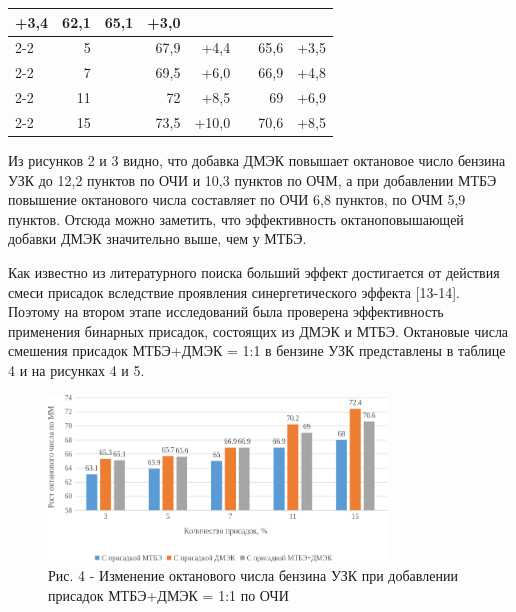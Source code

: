 \begin{table}[H]
{\begin{tabular}{|l|r|rrr|rrr|}
  +3,4 &
  \multicolumn{1}{r|}{\multirow{5}{*}{62,1}} &
  \multicolumn{1}{r|}{65,1} &
  +3,0 \\ \cline{2-2} \cline{4-5} \cline{7-8} 
 &
  5 &
  \multicolumn{1}{r|}{} &
  \multicolumn{1}{r|}{67,9} &
  +4,4 &
  \multicolumn{1}{r|}{} &
  \multicolumn{1}{r|}{65,6} &
  +3,5 \\ \cline{2-2} \cline{4-5} \cline{7-8} 
 &
  7 &
  \multicolumn{1}{r|}{} &
  \multicolumn{1}{r|}{69,5} &
  +6,0 &
  \multicolumn{1}{r|}{} &
  \multicolumn{1}{r|}{66,9} &
  +4,8 \\ \cline{2-2} \cline{4-5} \cline{7-8} 
 &
  11 &
  \multicolumn{1}{r|}{} &
  \multicolumn{1}{r|}{72} &
  +8,5 &
  \multicolumn{1}{r|}{} &
  \multicolumn{1}{r|}{69} &
  +6,9 \\ \cline{2-2} \cline{4-5} \cline{7-8} 
 &
  15 &
  \multicolumn{1}{r|}{} &
  \multicolumn{1}{r|}{73,5} &
  +10,0 &
  \multicolumn{1}{r|}{} &
  \multicolumn{1}{r|}{70,6} &
  +8,5 \\ \hline
\end{tabular}
}
\end{table}

\begin{multicols}{2}
Из рисунков 2 и 3 видно, что добавка ДМЭК повышает октановое число
бензина УЗК до 12,2 пунктов по ОЧИ и 10,3 пунктов по ОЧМ, а при
добавлении МТБЭ повышение октанового числа составляет по ОЧИ 6,8
пунктов, по ОЧМ 5,9 пунктов. Отсюда можно заметить, что эффективность
октаноповышающей добавки ДМЭК значительно выше, чем у МТБЭ.

Как известно из литературного поиска больший эффект достигается от
действия смеси при­садок вследствие проявления синергетического эф­фекта
{[}13-14{]}. Поэтому на втором этапе исследований была проверена
эффективность применения бинарных присадок, состоящих из ДМЭК и МТБЭ.
Октановые числа смешения присадок МТБЭ+ДМЭК = 1:1 в бензине УЗК
представлены в таблице 4 и на рисунках 4 и 5.
\end{multicols}

\begin{figure}[H]
	\centering
	\includegraphics[width=0.8\textwidth]{media/chem/image100}
	\caption*{Рис. 4 - Изменение октанового числа бензина УЗК при добавлении
присадок МТБЭ+ДМЭК = 1:1 по ОЧИ}
\end{figure}

